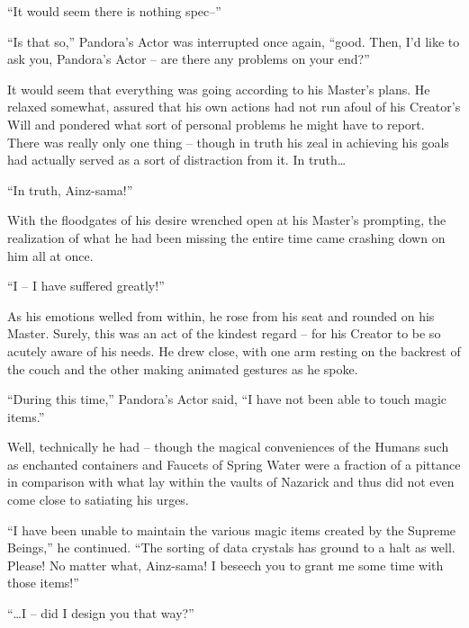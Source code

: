  

“It would seem there is nothing spec–”

 

“Is that so,” Pandora’s Actor was interrupted once again, “good. Then, I’d like to ask you, Pandora’s Actor – are there any problems on your end?”

 

It would seem that everything was going according to his Master’s plans. He relaxed somewhat, assured that his own actions had not run afoul of his Creator’s Will and pondered what sort of personal problems he might have to report. There was really only one thing – though in truth his zeal in achieving his goals had actually served as a sort of distraction from it. In truth…

 

“In truth, Ainz-sama!”

 

With the floodgates of his desire wrenched open at his Master’s prompting, the realization of what he had been missing the entire time came crashing down on him all at once.

 

“I – I have suffered greatly!”

 

As his emotions welled from within, he rose from his seat and rounded on his Master. Surely, this was an act of the kindest regard – for his Creator to be so acutely aware of his needs. He drew close, with one arm resting on the backrest of the couch and the other making animated gestures as he spoke.

 

“During this time,” Pandora’s Actor said, “I have not been able to touch magic items.”

 

Well, technically he had – though the magical conveniences of the Humans such as enchanted containers and Faucets of Spring Water were a fraction of a pittance in comparison with what lay within the vaults of Nazarick and thus did not even come close to satiating his urges.

 

“I have been unable to maintain the various magic items created by the Supreme Beings,” he continued. “The sorting of data crystals has ground to a halt as well. Please! No matter what, Ainz-sama! I beseech you to grant me some time with those items!”

 

“…I – did I design you that way?”

